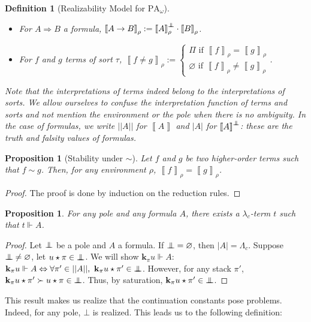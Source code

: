 \documentclass[a4paper,12pt]{article}
\newtheorem{prop}[theo]{Proposition}
\newtheorem{defi}[theo]{Definition}
\theoremstyle{rmqstyle}
\newcommand{\abs}[1]{\lvert#1\rvert}
\newcommand{\abss}[1]{\lvert \lvert#1\rvert \rvert}
\newcommand{\itp}[1]{\left\llbracket#1\right\rrbracket}
\newcommand{\PA}{\mathrm{PA}}
\renewcommand{\implies}{\Rightarrow}
\renewcommand{\iff}{\Leftrightarrow}
\renewcommand{\k}{\mathbf{k}}
\newcommand{\pole}{{\protect\mathpalette{\protect\polehelper}{\bot}}} \def\polehelper#1#2{\mathrel{\rlap{$#1#2$}\mkern3mu{#1#2}}}
\begin{document}
\begin{defi}[Realizability Model for $\PA_\omega$]
\begin{itemize}
\item For $A \implies B$ a formula, $\itp{A \to B}_\rho := \itp{A}_\rho^\pole \cdot \itp{B}_\rho$.\\
\item For $f$ and $g$ terms of sort $\tau$, $\itp{f \neq g}_\rho := 
\left\{ \begin{array}{c}
\Pi \text{ if } \itp{f}_\rho = \itp{g}_\rho \\
\varnothing \text{ if } \itp{f}_\rho \neq \itp{g}_\rho
\end{array}\right.$.
\end{itemize}
Note that the interpretations of terms indeed belong to the interpretations of sorts. We allow ourselves to confuse the interpretation function of terms and sorts and not mention the environment or the pole when there is no ambiguity. In the case of formulas, we write $\abss{A}$ for $\itp{A}$ and $\abs{A}$ for $\itp{A}^\pole$: these are the truth and falsity values of formulas.
\end{defi}

\begin{prop}[Stability under $\sim$]
\label{sim stab}
Let $f$ and $g$ be two higher-order terms such that $f \sim g$. Then, for any environment $\rho$, $\itp{f}_\rho = \itp{g}_\rho$.
\end{prop}

\begin{proof}
The proof is done by induction on the reduction rules.
\end{proof}

\begin{prop}
For any pole and any formula $A$, there exists a $\lambda_c$-term $t$ such that $t \Vdash A$.
\end{prop}

\begin{proof}
Let $\pole$ be a pole and $A$ a formula. If $\pole = \varnothing$, then $\abs{A} = \Lambda_c$. Suppose $\pole \neq \varnothing$, let $u \star \pi \in \pole$. We will show $\k_\pi u \Vdash A$:\\
$\k_\pi u \Vdash A \iff \forall \pi' \in \abss{A}, \  \k_\pi u \star \pi' \in \pole$. However, for any stack $\pi'$, $\k_\pi u \star \pi' \succ u \star \pi \in \pole$. Thus, by saturation, $\k_\pi u \star \pi' \in \pole$.
\end{proof}

This result makes us realize that the continuation constants pose problems. Indeed, for any pole, $\bot$ is realized. This leads us to the following definition:
\end{document}
